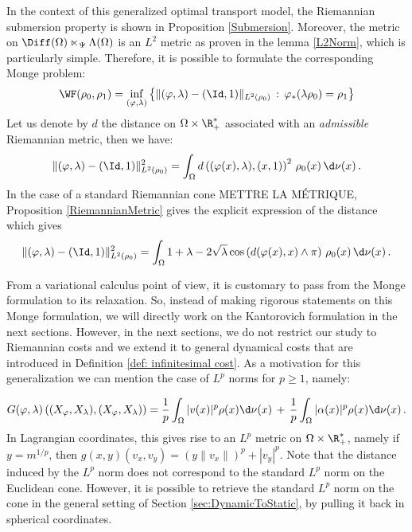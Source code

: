 In the context of this generalized optimal transport model, the Riemannian submersion property is shown in Proposition \ref{Submersion}. Moreover, the metric on $\Diff(\Omega) \ltimes_\Psi \Lambda(\Omega)$ is an $L^2$ metric as proven in the lemma \ref{L2Norm}, which is particularly simple. Therefore, it is possible to formulate the corresponding Monge problem:
\begin{equation}
\WF(\rho_0, \rho_1) = \inf_{(\varphi,\lambda) } \left\{ \| (\varphi,\lambda) - (\Id,1)  \|_{L^2(\rho_0)} \, : \, \varphi_* (\lambda \rho_0 )= \rho_1 \right\}
\end{equation}
Let us denote by $d$ the distance on $\Omega \times \R_+^*$ associated with an \textit{admissible} Riemannian metric, then we have:
\begin{equation}
\| (\varphi,\lambda) - (\Id,1)  \|_{L^2(\rho_0)}^2 = \int_\Omega d\left( (\varphi(x),\lambda) , (x,1)\right)^2  \, \rho_0(x) \, \d \nu(x) \,.
\end{equation}
In the case of a standard Riemannian cone METTRE LA MÉTRIQUE, Proposition \ref{RiemannianMetric} gives the explicit expression of the distance which gives
\begin{equation}
\| (\varphi,\lambda) - (\Id,1)  \|_{L^2(\rho_0)}^2 = \int_\Omega 1 + \lambda -2\sqrt{\lambda}  \cos \left(d(\varphi(x),x) \wedge \pi \right)  \, \rho_0(x) \,  \d \nu(x)\,.
\end{equation}

From a variational calculus point of view, it is customary to pass from the Monge formulation to its relaxation. So, instead of making rigorous statements on this Monge formulation, we will directly work on the Kantorovich formulation in the next sections. However, in the next sections, we do not restrict our study to Riemannian costs and we extend it to general dynamical costs that are introduced in Definition \ref{def: infinitesimal cost}. As a motivation for this generalization we can mention the case of $L^p$ norms for $p\geq 1$, namely:

\begin{multline}
G(\varphi,\lambda)\left((X_\varphi,X_\lambda) , (X_\varphi,X_\lambda)\right)= \frac{1}{p} \int_{\Omega} | v(x)  |^p \rho(x)  \d \nu(x) \,+\, \frac{1}{p} \int_{\Omega}  | \alpha(x)|^p  \rho(x)  \d \nu(x) \,.
\end{multline}
In Lagrangian coordinates, this gives rise to an $L^p$ metric on $\Omega \times \R_+^*$, namely if $y=m^{1/p}$, then $g(x,y)(v_x,v_y) = (y \|v_x\|)^p + |v_y|^p$. Note that the distance induced by the $L^p$ norm does not correspond to the standard $L^p$ norm on the Euclidean cone. However, it is possible to retrieve the standard $L^p$ norm on the cone in the general setting of Section \ref{sec:DynamicToStatic}, by pulling it back in spherical coordinates.


